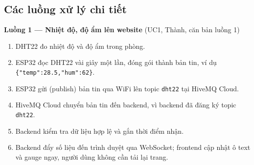 \documentclass[12pt,a4paper]{article}
\begin{document}
\begin{minipage}{\linewidth}
\begin{center}
{}
\label{fig:arch}
\end{center}
\end{minipage}
\par\bigskip

\subsection{Các luồng xử lý chi tiết}

\noindent\begin{minipage}{\linewidth}
\setlength{\parskip}{4pt}
\textbf{Luồng 1 --- Nhiệt độ, độ ẩm lên website} (UC1, Thành, căn bản luồng 1)
\begin{enumerate}[leftmargin=2em]
  \item DHT22 đo nhiệt độ và độ ẩm trong phòng.
  \item ESP32 đọc DHT22 vài giây một lần, đóng gói thành bản tin, ví dụ \texttt{\{"temp":28.5,"hum":62\}}.
  \item ESP32 gửi (publish) bản tin qua WiFi lên topic \texttt{dht22} tại HiveMQ Cloud.
  \item HiveMQ Cloud chuyển bản tin đến backend, vì backend đã đăng ký topic \texttt{dht22}.
  \item Backend kiểm tra dữ liệu hợp lệ và gắn thời điểm nhận.
  \item Backend đẩy số liệu đến trình duyệt qua WebSocket; frontend cập nhật ô text và gauge ngay, người dùng không cần tải lại trang.
\end{enumerate}
\end{minipage}
\par\medskip
\end{document}
